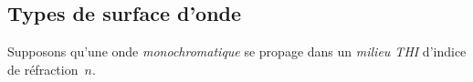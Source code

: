 \documentclass[12pt,fancy]{cours}
\begin{document}
%
%
%
%


\subsection{Types de surface d'onde}
Supposons qu'une onde \emph{monochromatique} se propage dans un \emph{milieu THI}
d’indice de réfraction~$n$. 
\end{document}
